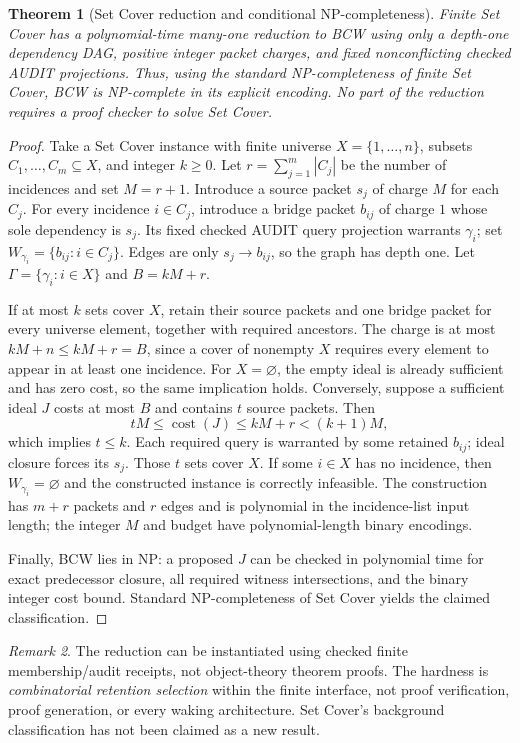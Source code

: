 \documentclass[10pt,letterpaper]{article}
\newtheorem{theorem}{Theorem}[section]
\theoremstyle{definition}
\theoremstyle{remark}
\newtheorem{remark}[theorem]{Remark}
\newcommand{\cost}{\operatorname{cost}}
\newcommand{\bn}{\textnormal{\textsc{BCW}}}
\begin{document}
\begin{theorem}[Set Cover reduction and conditional NP-completeness]\label{thm:NP}
Finite Set Cover has a polynomial-time many-one reduction to \bn{} using only a depth-one dependency DAG, positive integer packet charges, and fixed nonconflicting checked AUDIT projections. Thus, using the standard NP-completeness of finite Set Cover, \bn{} is NP-complete in its explicit encoding. No part of the reduction requires a proof checker to solve Set Cover.
\end{theorem}
\begin{proof}
Take a Set Cover instance with finite universe $X=\{1,\dots,n\}$, subsets $C_1,\dots,C_m\subseteq X$, and integer $k\ge0$. Let $r=\sum_{j=1}^m|C_j|$ be the number of incidences and set $M=r+1$. Introduce a source packet $s_j$ of charge $M$ for each $C_j$. For every incidence $i\in C_j$, introduce a bridge packet $b_{ij}$ of charge $1$ whose sole dependency is $s_j$. Its fixed checked AUDIT query projection warrants $\gamma_i$; set $W_{\gamma_i}=\{b_{ij}:i\in C_j\}$. Edges are only $s_j\to b_{ij}$, so the graph has depth one. Let $\Gamma=\{\gamma_i:i\in X\}$ and $B=kM+r$.

If at most $k$ sets cover $X$, retain their source packets and one bridge packet for every universe element, together with required ancestors. The charge is at most $kM+n\le kM+r=B$, since a cover of nonempty $X$ requires every element to appear in at least one incidence. For $X=\varnothing$, the empty ideal is already sufficient and has zero cost, so the same implication holds. Conversely, suppose a sufficient ideal $J$ costs at most $B$ and contains $t$ source packets. Then
\[
tM\le\cost(J)\le kM+r<(k+1)M,
\]
which implies $t\le k$. Each required query is warranted by some retained $b_{ij}$; ideal closure forces its $s_j$. Those $t$ sets cover $X$. If some $i\in X$ has no incidence, then $W_{\gamma_i}=\varnothing$ and the constructed instance is correctly infeasible. The construction has $m+r$ packets and $r$ edges and is polynomial in the incidence-list input length; the integer $M$ and budget have polynomial-length binary encodings.

Finally, \bn{} lies in NP: a proposed $J$ can be checked in polynomial time for exact predecessor closure, all required witness intersections, and the binary integer cost bound. Standard NP-completeness of Set Cover yields the claimed classification.\end{proof}

\begin{remark}
The reduction can be instantiated using checked finite membership/audit receipts, not object-theory theorem proofs. The hardness is \emph{combinatorial retention selection} within the finite interface, not proof verification, proof generation, or every waking architecture. Set Cover's background classification has not been claimed as a new result.
\end{remark}
\end{document}
